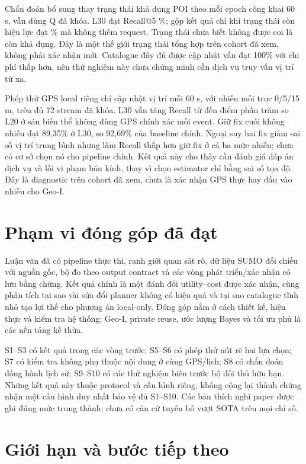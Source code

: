 Chẩn đoán bổ sung thay trạng thái khả dụng POI theo mỗi epoch công khai 60 s, vẫn dùng Q đã khóa. L30 đạt Recall@5 \EvalDynamicLThirtyCurrent{}\%; gộp kết quả chỉ khi trạng thái còn hiệu lực đạt \EvalDynamicLThirtyCached{}\% mà không thêm request. Trạng thái chưa biết không được coi là còn khả dụng. Đây là một thế giới trạng thái tổng hợp trên cohort đã xem, không phải xác nhận mới. Catalogue đầy đủ được cập nhật vẫn đạt 100\% với chi phí thấp hơn, nên thử nghiệm này chưa chứng minh cần dịch vụ truy vấn vị trí từ xa.

Phép thử GPS local riêng chỉ cập nhật vị trí mỗi 60 s, với nhiễu mỗi trục 0/5/15 m, trên đủ 72 stream đã khóa. L30 vẫn tăng Recall từ \SensorMinNonOracleGain{} đến \SensorMaxNonOracleGain{} điểm phần trăm so L20 ở sáu biến thể không dùng GPS chính xác mỗi event. Giữ fix cuối không nhiễu đạt 89,35\% ở L30, so 92,69\% của baseline chính. Ngoại suy hai fix giảm sai số vị trí trung bình nhưng làm Recall thấp hơn giữ fix ở cả ba mức nhiễu; chưa có cơ sở chọn nó cho pipeline chính. Kết quả này cho thấy cần đánh giá đáp án dịch vụ và lỗi vi phạm bán kính, thay vì chọn estimator chỉ bằng sai số tọa độ. Đây là diagnostic trên cohort đã xem, chưa là xác nhận GPS thực hay đầu vào nhiễu cho Geo-I.

\section{Phạm vi đóng góp đã đạt}

Luận văn đã có pipeline thực thi, ranh giới quan sát rõ, dữ liệu SUMO đối chiếu với nguồn gốc, bộ đo theo output contract và các vòng phát triển/xác nhận có lưu bằng chứng. Kết quả chính là một đánh đổi utility--cost được xác nhận, cùng phân tích tại sao vài sửa đổi planner không có hiệu quả và tại sao catalogue tĩnh nhỏ tạo lợi thế cho phương án local-only. Đóng góp nằm ở cách thiết kế, hiện thực và kiểm tra hệ thống; Geo-I, private reuse, ước lượng Bayes và tối ưu phủ là các nền tảng kế thừa.

S1--S3 có kết quả trong các vòng trước; S5--S6 có phép thử nút rẽ hai lựa chọn; S7 có kiểm tra không phụ thuộc nội dung ở cùng GPS/lịch; S8 có chẩn đoán đồng hành lịch sử; S9--S10 có các thử nghiệm biên trước bộ đối thủ hữu hạn. Những kết quả này thuộc protocol và cấu hình riêng, không cộng lại thành chứng nhận một cấu hình duy nhất bảo vệ đủ S1--S10. Các bản thích nghi paper được ghi đúng mức trung thành; chưa có căn cứ tuyên bố vượt SOTA trên mọi chỉ số.

\section{Giới hạn và bước tiếp theo}

